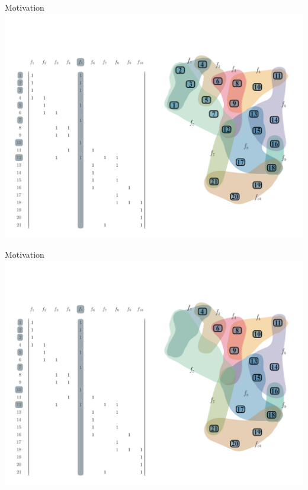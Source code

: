 \documentclass[10pt]{beamer}
\begin{document}
\begin{frame}[fragile]{Motivation}
    \vspace*{-3em}\hspace*{-2em}\includegraphics[width=1.15\textwidth]{Images/LSAExample/02}
\end{frame}

\begin{frame}[fragile]{Motivation}
    \vspace*{-3em}\hspace*{-2em}\includegraphics[width=1.15\textwidth]{Images/LSAExample/03}
\end{frame}
\end{document}
